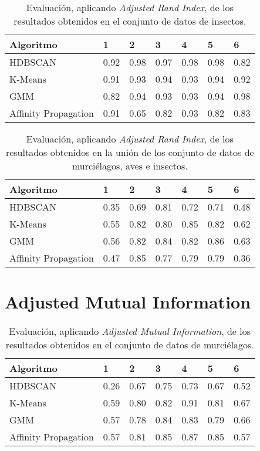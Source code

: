\begin{table}[H]
    \centering
    \begin{tabular}{lllllll}
        \hline
        Algoritmo & 1 & 2 & 3 & 4 & 5 & 6  \\ \hline
        HDBSCAN & 0.92 & \cellcolor[HTML]{FFFC9E}0.98 & 0.97 & \cellcolor[HTML]{FFFC9E}0.98 & \cellcolor[HTML]{FFFC9E}0.98 & 0.82 \\
        K-Means & 0.91 & 0.93 & 0.94 & 0.93 & 0.94 & 0.92 \\
        GMM & 0.82 & 0.94 & 0.93 & 0.93 & 0.94 & \cellcolor[HTML]{FFFC9E}0.98 \\
        Affinity Propagation & 0.91 & 0.65 & 0.82 & 0.93 & 0.82 & 0.83
    \end{tabular}
    \caption{Evaluación, aplicando \textit{Adjusted Rand Index}, de los resultados obtenidos en el conjunto de datos de insectos.}
    \label{table:insects-ari}
\end{table}

\begin{table}[H]
    \centering
    \begin{tabular}{lllllll}
        \hline
        Algoritmo & 1 & 2 & 3 & 4 & 5 & 6  \\ \hline
        HDBSCAN & 0.35 & 0.69 & 0.81 & 0.72 & 0.71 & 0.48 \\
        K-Means & 0.55 & 0.82 & 0.80 & 0.85 & 0.82 & 0.62 \\
        GMM & 0.56 & 0.82 & 0.84 & 0.82 & \cellcolor[HTML]{FFFC9E}0.86 & 0.63 \\
        Affinity Propagation & 0.47 & 0.85 & 0.77 & 0.79 & 0.79 & 0.36
    \end{tabular}
    \caption{Evaluación, aplicando \textit{Adjusted Rand Index}, de los resultados obtenidos en la unión de los conjunto de datos de murciélagos, aves e insectos.}
    \label{table:all-ari}
\end{table}

\section{Adjusted Mutual Information}\label{sec:AMI-evaluation}

\begin{table}[H]
    \centering
    \begin{tabular}{lllllll}
        \hline
        Algoritmo & 1 & 2 & 3 & 4 & 5 & 6  \\ \hline
        HDBSCAN & 0.26 & 0.67 & 0.75 & 0.73 & 0.67 & 0.52 \\
        K-Means & 0.59 & 0.80 & 0.82 & \cellcolor[HTML]{FFFC9E}0.91 & 0.81 & 0.67 \\
        GMM & 0.57 & 0.78 & 0.84 & 0.83 & 0.79 & 0.66 \\
        Affinity Propagation & 0.57 & 0.81 & 0.85 & 0.87 & 0.85 & 0.57
    \end{tabular}
    \caption{Evaluación, aplicando \textit{Adjusted Mutual Information}, de los resultados obtenidos en el conjunto de datos de murciélagos.}
    \label{table:bats-ami}
\end{table}

